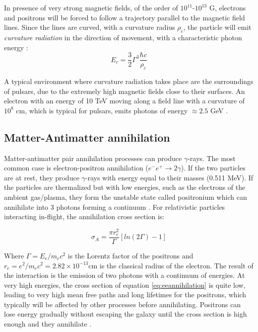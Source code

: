 \documentclass[main.tex]{subfiles}
\begin{document}
In presence of very strong magnetic fields, of the order of $10^{11}$-$10^{13}$ G, electrons and positrons will be forced to follow a trajectory parallel to the magnetic field lines. Since the lines are curved, with a curvature radius $\rho_{c}$, the particle will emit \textit{curvature radiation} in the direction of movement, with a characteristic photon energy \cite{Pulsars}:
\begin{equation}
    E_{c} = \frac{3}{2} \Gamma^3\frac{\hbar c}{\rho_c}
\end{equation}

A typical environment where curvature radiation takes place are the surroundings of pulsars, due to the extremely high magnetic fields close to their surfaces. An electron with an energy of 10 TeV moving along a field line with a curvature of $10^8$ cm, which is typical for pulsars, emits photons of energy $\approx 2.5$ GeV \cite{1993MurthyGammaRay}. 

\subsection{Matter-Antimatter annihilation}

Matter-antimatter pair annihilation processes can produce $\gamma$-rays. The most common case is electron-positron annihilation ($e^-e^+\rightarrow 2\gamma$). If the two particles are at rest, they produce $\gamma$-rays with energy equal to their masses (0.511 MeV). If the particles are thermalized but with low energies, such as the electrons of the ambient gas/plasma, they form the unstable state called positronium which can annihilate into 3 photons forming a continuum \cite{2004VHECosmicGammaRadiation}.
For relativistic particles interacting in-flight, the annihilation cross section is:

\begin{equation}\label{eq:eeannihilation}
    \sigma_{A} = \frac{\pi r_{e}^{2}}{\Gamma} [ln(2\Gamma)-1]
\end{equation}

Where $\Gamma=E_e/m_ec^2$ is the Lorentz factor of the positrons and $r_e=e^2/m_ec^2 = 2.82 \times 10^{-13} $cm is the classical radius of the electron. The result of the interaction is the emission of two photons with a continuum of energies. At very high energies, the cross section of equation \ref{eq:eeannihilation} is quite low, leading to very high mean free paths and long lifetimes for the positrons, which typically will be affected by other processes before annihilating. Positrons can lose energy gradually without escaping the galaxy until the cross section is high enough and they annihilate \cite{1993MurthyGammaRay}.
\end{document}
